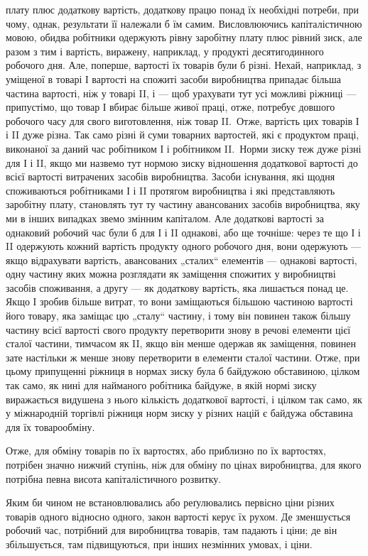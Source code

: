 \parcont{}  %
плату плюс додаткову вартість, додаткову працю понад їх необхідні
потреби, при чому, однак, результати її належали б їм
самим. Висловлюючись капіталістичною мовою, обидва робітники
одержують рівну заробітну плату плюс рівний зиск, але разом
з тим і вартість, виражену, наприклад, у продукті десятигодинного
робочого дня. Але, поперше, вартості їх товарів були б
різні. Нехай, наприклад, з уміщеної в товарі І вартості на спожиті
засоби виробництва припадає більша частина вартості, ніж у товарі
II, і — щоб урахувати тут усі можливі ріжниці — припустімо,
що товар І вбирає більше живої праці, отже, потребує довшого
робочого часу для свого виготовлення, ніж товар II.~Отже, вартість
цих товарів І і II дуже різна. Так само різні й суми товарних вартостей,
які є продуктом праці, виконаної за даний час робітником
І і робітником II.~Норми зиску теж дуже різні для І і II,
якщо ми назвемо тут нормою зиску відношення додаткової вартості
до всієї вартості витрачених засобів виробництва. Засоби
існування, які щодня споживаються робітниками І і II протягом
виробництва і які представляють заробітну плату, становлять
тут ту частину авансованих засобів виробництва, яку ми в інших
випадках звемо змінним капіталом. Але додаткові вартості за
однаковий робочий час були б для І і II однакові, або ще точніше:
через те що І і II одержують кожний вартість продукту
одного робочого дня, вони одержують — якщо відрахувати вартість,
авансованих „сталих“ елементів — однакові вартості, одну
частину яких можна розглядати як заміщення спожитих у виробництві
засобів споживання, а другу — як додаткову вартість,
яка лишається понад це. Якщо І зробив більше витрат, то вони
заміщаються більшою частиною вартості його товару, яка заміщає
цю „сталу“ частину, і тому він повинен також більшу
частину всієї вартості свого продукту перетворити знову в речові
елементи цієї сталої частини, тимчасом як II, якщо він
менше одержав як заміщення, повинен зате настільки ж менше
знову перетворити в елементи сталої частини. Отже, при цьому
припущенні ріжниця в нормах зиску була б байдужою обставиною,
цілком так само, як нині для найманого робітника байдуже,
в якій нормі зиску виражається видушена з нього кількість
додаткової вартості, і цілком так само, як у міжнародній торгівлі
ріжниця норм зиску у різних націй є байдужа обставина
для їх товарообміну.

\enlargethispage{\baselineskip}

Отже, для обміну товарів по їх вартостях, або приблизно
по їх вартостях, потрібен значно нижчий ступінь, ніж для обміну
по цінах виробництва, для якого потрібна певна висота капіталістичного
розвитку.

Яким би чином не встановлювались або реґулювались первісно
ціни різних товарів одного відносно одного, закон вартості
керує їх рухом. Де зменшується робочий час, потрібний для
виробництва товарів, там падають і ціни; де він збільшується,
там підвищуються, при інших незмінних умовах, і ціни.
